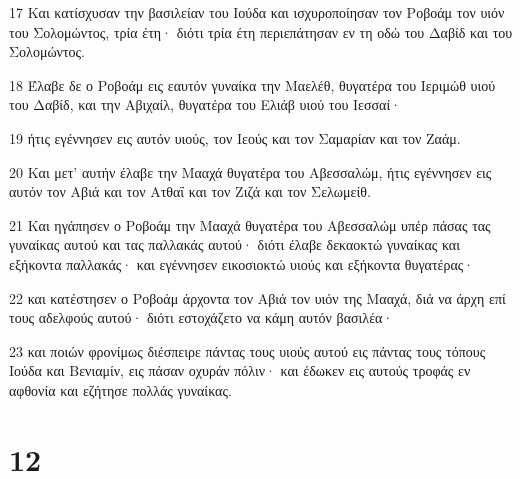 \par 17 Και κατίσχυσαν την βασιλείαν του Ιούδα και ισχυροποίησαν τον Ροβοάμ τον υιόν του Σολομώντος, τρία έτη· διότι τρία έτη περιεπάτησαν εν τη οδώ του Δαβίδ και του Σολομώντος.
\par 18 Έλαβε δε ο Ροβοάμ εις εαυτόν γυναίκα την Μαελέθ, θυγατέρα του Ιεριμώθ υιού του Δαβίδ, και την Αβιχαίλ, θυγατέρα του Ελιάβ υιού του Ιεσσαί·
\par 19 ήτις εγέννησεν εις αυτόν υιούς, τον Ιεούς και τον Σαμαρίαν και τον Ζαάμ.
\par 20 Και μετ' αυτήν έλαβε την Μααχά θυγατέρα του Αβεσσαλώμ, ήτις εγέννησεν εις αυτόν τον Αβιά και τον Ατθαΐ και τον Ζιζά και τον Σελωμείθ.
\par 21 Και ηγάπησεν ο Ροβοάμ την Μααχά θυγατέρα του Αβεσσαλώμ υπέρ πάσας τας γυναίκας αυτού και τας παλλακάς αυτού· διότι έλαβε δεκαοκτώ γυναίκας και εξήκοντα παλλακάς· και εγέννησεν εικοσιοκτώ υιούς και εξήκοντα θυγατέρας·
\par 22 και κατέστησεν ο Ροβοάμ άρχοντα τον Αβιά τον υιόν της Μααχά, διά να άρχη επί τους αδελφούς αυτού· διότι εστοχάζετο να κάμη αυτόν βασιλέα·
\par 23 και ποιών φρονίμως διέσπειρε πάντας τους υιούς αυτού εις πάντας τους τόπους Ιούδα και Βενιαμίν, εις πάσαν οχυράν πόλιν· και έδωκεν εις αυτούς τροφάς εν αφθονία και εζήτησε πολλάς γυναίκας.

\chapter{12}

